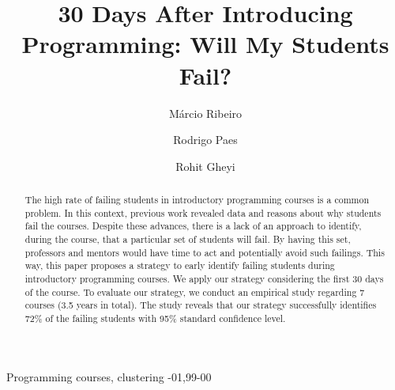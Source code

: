 \documentclass[review]{elsarticle}
\begin{document}
\begin{frontmatter}

\title{30 Days After Introducing Programming: Will My Students Fail?}



\author[ufal]{M\'{a}rcio Ribeiro}

\author[ufal]{Rodrigo Paes}

\author[ufcg]{Rohit Gheyi}

\address[ufal]{Federal University of Alagoas, Macei\'{o}, Brazil}
\address[ufcg]{Federal University of Campina Grande, Campina Grande, Brazil}

\begin{abstract}
The high rate of failing students in introductory programming courses is a common problem. In this context, previous work revealed data and reasons about why students fail the courses. Despite these advances, there is a lack of an approach to identify, during the course, that a particular set of students will fail. By having this set, professors and mentors would have time to act and potentially avoid such failings. This way, this paper proposes a strategy to early identify failing students during introductory programming courses. We apply our strategy considering the first 30 days of the course. To evaluate our strategy, we conduct an empirical study regarding 7 courses (3.5 years in total). The study reveals that our strategy successfully identifies 72\% of the failing students with 95\% standard confidence level.
\end{abstract}

\begin{keyword}
Programming courses, clustering
-01\sep  99-00
\end{keyword}

\end{frontmatter}

\linenumbers















\end{document}
